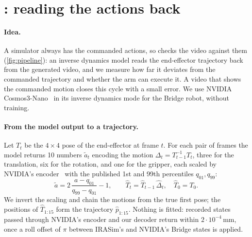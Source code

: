 \section{\ours{}: reading the actions back}
\label{sec:improve}

\paragraph{Idea.}
A simulator always has the commanded actions, so \ours{} checks the video against them (\cref{fig:pipeline}): an inverse dynamics model reads the end-effector trajectory back from the generated video, and we measure how far it deviates from the commanded trajectory and whether the arm can execute it.
A video that shows the commanded motion closes this cycle with a small error.
We use NVIDIA Cosmos3-Nano~\cite{nvidia2026cosmos3} in its inverse dynamics mode for the Bridge robot, without training.

\paragraph{From the model output to a trajectory.}
Let $T_t$ be the $4\times4$ pose of the end-effector at frame $t$.
For each pair of frames the model returns 10 numbers $\tilde a_t$ encoding the motion $\Delta_t=T_{t-1}^{-1}T_t$, three for the translation, six for the rotation, and one for the gripper, each scaled by NVIDIA's encoder~\cite{nvidia2026framework} with the published 1st and 99th percentiles $q_{01},q_{99}$:
\begin{equation}
  \tilde a = 2\,\frac{a-q_{01}}{q_{99}-q_{01}} - 1, \qquad \hat T_t = \hat T_{t-1}\,\hat\Delta_t,\quad \hat T_0 = T_0 .
  \label{eq:quantile}
\end{equation}
We invert the scaling and chain the motions from the true first pose; the positions of $\hat T_{1:15}$ form the trajectory $\hat p_{1:15}$.
Nothing is fitted: recorded states passed through NVIDIA's encoder and our decoder return within $2\cdot10^{-4}$\,mm, once a roll offset of $\pi$ between IRASim's and NVIDIA's Bridge states is applied.

